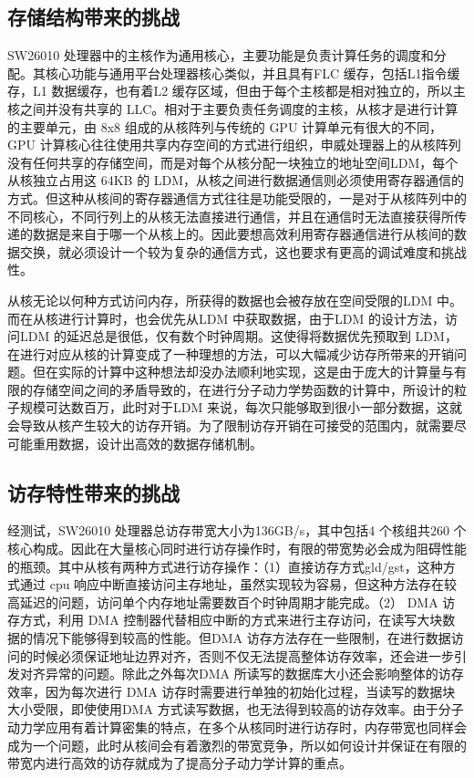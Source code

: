 \subsection{存储结构带来的挑战}
SW26010 处理器中的主核作为通用核心，主要功能是负责计算任务的调度和分配。其核心功能与通用平台处理器核心类似，并且具有FLC 缓存，包括L1指令缓存，L1 数据缓存，也有着L2 缓存区域，但由于每个主核都是相对独立的，所以主核之间并没有共享的 LLC。相对于主要负责任务调度的主核，从核才是进行计算的主要单元，由 8x8 组成的从核阵列与传统的 GPU 计算单元有很大的不同，GPU 计算核心往往使用共享内存空间的方式进行组织，申威处理器上的从核阵列没有任何共享的存储空间，而是对每个从核分配一块独立的地址空间LDM，每个从核独立占用这 64KB 的 LDM，从核之间进行数据通信则必须使用寄存器通信的方式。但这种从核间的寄存器通信方式往往是功能受限的，一是对于从核阵列中的不同核心，不同行列上的从核无法直接进行通信，并且在通信时无法直接获得所传递的数据是来自于哪一个从核上的。因此要想高效利用寄存器通信进行从核间的数据交换，就必须设计一个较为复杂的通信方式，这也要求有更高的调试难度和挑战性。

从核无论以何种方式访问内存，所获得的数据也会被存放在空间受限的LDM 中。而在从核进行计算时，也会优先从LDM 中获取数据，由于LDM 的设计方法，访问LDM 的延迟总是很低，仅有数个时钟周期。这使得将数据优先预取到 LDM，在进行对应从核的计算变成了一种理想的方法，可以大幅减少访存所带来的开销问题。但在实际的计算中这种想法却没办法顺利地实现，这是由于庞大的计算量与有限的存储空间之间的矛盾导致的，在进行分子动力学势函数的计算中，所设计的粒子规模可达数百万，此时对于LDM 来说，每次只能够取到很小一部分数据，这就会导致从核产生较大的访存开销。为了限制访存开销在可接受的范围内，就需要尽可能重用数据，设计出高效的数据存储机制。

\subsection{访存特性带来的挑战}
经测试，SW26010 处理器总访存带宽大小为136GB/s，其中包括4 个核组共260 个核心构成。因此在大量核心同时进行访存操作时，有限的带宽势必会成为阻碍性能的瓶颈。其中从核有两种方式进行访存操作：（1）直接访存方式gld/gst，这种方式通过 cpu 响应中断直接访问主存地址，虽然实现较为容易，但这种方法存在较高延迟的问题，访问单个内存地址需要数百个时钟周期才能完成。（2） DMA 访存方式，利用 DMA 控制器代替相应中断的方式来进行主存访问，在读写大块数据的情况下能够得到较高的性能。但DMA 访存方法存在一些限制，在进行数据访问的时候必须保证地址边界对齐，否则不仅无法提高整体访存效率，还会进一步引发对齐异常的问题。除此之外每次DMA 所读写的数据库大小还会影响整体的访存效率，因为每次进行 DMA 访存时需要进行单独的初始化过程，当读写的数据块大小受限，即使使用DMA 方式读写数据，也无法得到较高的访存效率。由于分子动力学应用有着计算密集的特点，在多个从核同时进行访存时，内存带宽也同样会成为一个问题，此时从核间会有着激烈的带宽竞争，所以如何设计并保证在有限的带宽内进行高效的访存就成为了提高分子动力学计算的重点。

